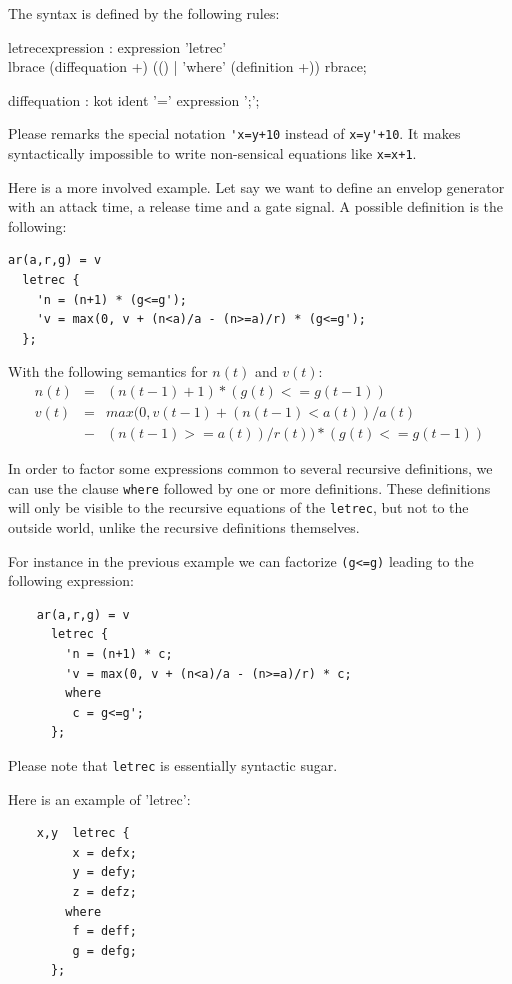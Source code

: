 The syntax is defined by the following rules:
\begin{rail}
	letrecexpression : expression 'letrec' \\ lbrace (diffequation +) (() | 'where' (definition +)) rbrace;
\end{rail}
\begin{rail}
	diffequation :    kot ident '=' expression ';';  
\end{rail}

Please remarks the special notation \lstinline|'x=y+10| instead of \lstinline|x=y'+10|. It makes syntactically impossible to write non-sensical equations like \lstinline|x=x+1|.

Here is a more involved example. Let say we want to define an envelop generator with an attack time, a release time and a gate signal. A possible definition is the following:

\begin{lstlisting}
ar(a,r,g) = v
  letrec {
    'n = (n+1) * (g<=g');
    'v = max(0, v + (n<a)/a - (n>=a)/r) * (g<=g');
  };
\end{lstlisting}
With the following semantics for $n(t)$ and $v(t)$:
\begin{eqnarray*}
	n(t)&=&(n(t-1)+1) * (g(t) <= g(t-1))\\
	v(t)&=& max(0, v(t-1) + (n(t-1)<a(t))/a(t) \\
						  &-& (n(t-1)>=a(t))/r(t)) * (g(t)<=g(t-1))
\end{eqnarray*}

In order to factor some expressions common to several recursive definitions, we can use the clause \lstinline'where' followed by one or more definitions. These definitions will only be visible to the recursive equations of the \lstinline'letrec', but not to the outside world, unlike the recursive definitions themselves.

For instance in the previous example we can factorize \lstinline'(g<=g)' leading to the following expression:

\begin{lstlisting}
	ar(a,r,g) = v
	  letrec {
		'n = (n+1) * c;
		'v = max(0, v + (n<a)/a - (n>=a)/r) * c;
		where
		 c = g<=g';
	  };
\end{lstlisting}

Please note that \lstinline'letrec' is essentially syntactic sugar.

Here is an example of 'letrec':

\begin{lstlisting}
	x,y  letrec {
		 x = defx;
		 y = defy;
		 z = defz;
		where
		 f = deff;
		 g = defg;
	  };
\end{lstlisting}

